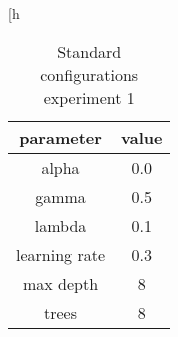 \begin{table}[h
\centering
\begin{tabular}{| c|c|}
\hline
parameter & value\\
\hline
alpha & 0.0\\\hline
gamma & 0.5\\\hline
lambda & 0.1\\\hline
learning rate & 0.3\\\hline
max depth & 8\\\hline
trees & 8\\\hline

\end{tabular}\caption{Standard configurations experiment 1} 
\label{tab:./Table/config experiment1_targetandshadow}
\end{table}
